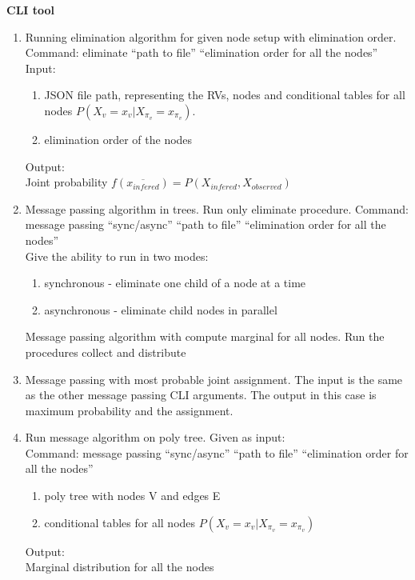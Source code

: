    \vspace{0.1cm}
    \textbf{CLI tool}\\
    \begin{enumerate}
        \item Running elimination algorithm for given node setup with elimination order.\\
        Command: eliminate \enquote{path to file} \enquote{elimination order for all the nodes}\\
        Input:\\
        \begin{enumerate}
            \item JSON file path, representing the RVs, nodes and conditional tables for all nodes $P(X_v=x_v|X_{\pi_v}=x_{\pi_v})$.
            \item elimination order of the nodes
        \end{enumerate}
        Output:\\
        Joint probability $f(\overline{x_{infered}})=P(X_{infered},X_{observed})$\\

        

        \item Message passing algorithm in trees. Run only eliminate procedure.
        Command: message passing \enquote{sync/async} \enquote{path to file} \enquote{elimination order for all the nodes}\\
        Give the ability to run in two modes:\\
        \begin{enumerate}
            \item synchronous - eliminate one child of a node at a time
            \item asynchronous - eliminate child nodes in parallel
        \end{enumerate}
        Message passing algorithm with compute marginal for all nodes. Run the procedures collect and distribute\\

        \item Message passing with most probable joint assignment. The input is the same as the other message passing CLI arguments. The output in this case is maximum probability and the assignment.

        \item Run message algorithm on poly tree. Given as input:\\
        Command: message passing \enquote{sync/async} \enquote{path to file} \enquote{elimination order for all the nodes}\\
        \begin{enumerate}
            \item poly tree with nodes V and edges E
            \item conditional tables for all nodes $P(X_v=x_v|X_{\pi_v}=x_{\pi_v})$
        \end{enumerate}
        Output:\\
        Marginal distribution for all the nodes
    \end{enumerate}

